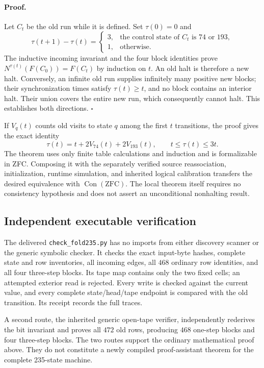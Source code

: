 \paragraph{Proof.}
Let $C_t$ be the old run while it is defined.  Set $\tau(0)=0$ and
\[
\tau(t+1)-\tau(t)=
\begin{cases}
3,&\text{the control state of }C_t\text{ is }74\text{ or }193,\\
1,&\text{otherwise}.
\end{cases}
\]
The inductive incoming invariant and the four block identities prove
$N^{\tau(t)}(F(C_0))=F(C_t)$ by induction on $t$.  An old halt is therefore
a new halt.  Conversely, an infinite old run supplies infinitely many
positive new blocks; their synchronization times satisfy $\tau(t)\ge t$,
and no block contains an interior halt.  Their union covers the entire new
run, which consequently cannot halt.  This establishes both directions.
\hfill$\square$

If $V_q(t)$ counts old visits to state $q$ among the first $t$ transitions,
the proof gives the exact identity
\[
\tau(t)=t+2V_{74}(t)+2V_{193}(t),\qquad t\le\tau(t)\le3t.
\]
The theorem uses only finite table calculations and induction and is
formalizable in ZFC.  Composing it with the separately verified source
reassociation, initialization, runtime simulation, and inherited logical
calibration transfers the desired equivalence with
$\operatorname{Con}(\mathrm{ZFC})$.  The local theorem itself requires no
consistency hypothesis and does not assert an unconditional nonhalting
result.

\subsection{Independent executable verification}

The delivered \texttt{check\_fold235.py} has no imports from either discovery
scanner or the generic symbolic checker.  It checks the exact input-byte
hashes, complete state and row inventories, all incoming edges, all $468$
ordinary row identities, and all four three-step blocks.  Its tape map
contains only the two fixed cells; an attempted exterior read is rejected.
Every write is checked against the current value, and every complete
state/head/tape endpoint is compared with the old transition.  Its receipt
records the full traces.

A second route, the inherited generic open-tape verifier, independently
rederives the bit invariant and proves all $472$ old rows, producing $468$
one-step blocks and four three-step blocks.  The two routes support the
ordinary mathematical proof above.  They do not constitute a newly
compiled proof-assistant theorem for the complete 235-state machine.
